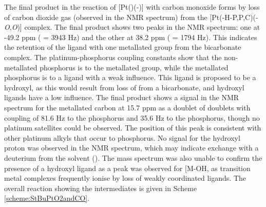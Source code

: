 The final product in the reaction of [Pt(\tButhixantphos)(-)] with carbon monoxide forms by loss of carbon dioxide gas (observed in the \carbon{} NMR spectrum) from the [Pt(\tButhixantphos-H-\dento{}P,P\textprime,C)(-\emph{O},\emph{O})] complex.  The final product shows two peaks in the \phosphorus{} NMR spectrum: one at -49.2 ppm (\JPtP{} = 3943 Hz) and the other at 38.2 ppm (\JPtP{} = 1794 Hz).  This indicates the retention of the \tButhixantphos{} ligand with one metallated \tBu{} group from the bicarbonate complex.  The platinum-phosphorus coupling constants show that the non-metallated phosphorus is \trans{} to the metallated \tBu{} group, while the metallated phosphorus is \trans{} to a ligand with a weak \trans{} influence.  This ligand is proposed to be a hydroxyl, as this would result from loss of  from a bicarbonate, and hydroxyl ligands have a low \trans{} influence.  The final product shows a signal in the \carbon{} NMR spectrum for the metallated carbon at 15.7 ppm as a doublet of doublets with coupling of 81.6 Hz to the \trans{} phosphorus and 35.6 Hz to the \cis{} phosphorus, though no platinum satellites could be observed.  The position of this peak is consistent with other platinum alkyls that occur \trans{} to phosphorus.\cite{Zayya2012, Zayya2012b, Sarahthesis}  No signal for the hydroxyl proton was observed in the \proton{} NMR spectrum, which may indicate exchange with a deuterium from the solvent ().  The mass spectrum was also unable to confirm the presence of a hydroxyl ligand as a peak was observed for [M-OH\ce{]+}, as transition metal complexes frequently ionise by loss of weakly coordinated ligands.\cite{Henderson1998}  The overall reaction showing the intermediates is given in Scheme \ref{scheme:StBuPtO2andCO}.

